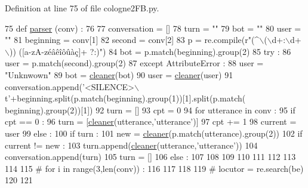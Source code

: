 Definition at line 75 of file cologne2\+F\+B.\+py.


\begin{DoxyCode}
75 \textcolor{keyword}{def }\hyperlink{namespaceparlai_1_1scripts_1_1cologne2FB_a3d8c5febb71cafe49cc8a5a71c4ba2c5}{parser} (conv) : 
76 
77     conversation = []
78     turn = \textcolor{stringliteral}{""}
79     bot = \textcolor{stringliteral}{""}
80     user = \textcolor{stringliteral}{""}
81     beginning = conv[1]
82     second = conv[2]
83     p = re.compile(\textcolor{stringliteral}{r"(^\(\backslash\)(\(\backslash\)d+:\(\backslash\)d+\(\backslash\))) ([a-zA-zéâêîôûàç]+ ?:)"})
84     bot = p.match(beginning).group(2)
85     \textcolor{keywordflow}{try} : 
86         user = p.match(second).group(2)
87     \textcolor{keywordflow}{except} AttributeError : 
88         user = \textcolor{stringliteral}{"Unknwown"}
89     bot = \hyperlink{namespaceparlai_1_1scripts_1_1cologne2FB_a8a2fb9f6897ef06ab2421d6682dca667}{cleaner}(bot)
90     user = \hyperlink{namespaceparlai_1_1scripts_1_1cologne2FB_a8a2fb9f6897ef06ab2421d6682dca667}{cleaner}(user)
91     conversation.append(\textcolor{stringliteral}{'<SILENCE>\(\backslash\)t'}+beginning.split(p.match(beginning).group(1))[1].split(p.match(
      beginning).group(2))[1])
92     turn = []
93     cpt = 0
94     \textcolor{keywordflow}{for} utterance \textcolor{keywordflow}{in} conv : 
95         \textcolor{keywordflow}{if} cpt == 0 : 
96             turn = [\hyperlink{namespaceparlai_1_1scripts_1_1cologne2FB_a8a2fb9f6897ef06ab2421d6682dca667}{cleaner}(utterance,\textcolor{stringliteral}{'utterance'})]
97             cpt += 1 
98             current = user
99         \textcolor{keywordflow}{else} : 
100             \textcolor{keywordflow}{if} turn :
101                 new = \hyperlink{namespaceparlai_1_1scripts_1_1cologne2FB_a8a2fb9f6897ef06ab2421d6682dca667}{cleaner}(p.match(utterance).group(2))
102                 \textcolor{keywordflow}{if} current != new : 
103                         turn.append(\hyperlink{namespaceparlai_1_1scripts_1_1cologne2FB_a8a2fb9f6897ef06ab2421d6682dca667}{cleaner}(utterance,\textcolor{stringliteral}{'utterance'}))
104                         conversation.append(turn)
105                         turn = []
106                     \textcolor{keywordflow}{else} : 
107 
108 
109 
110 
111 
112 
113 
114 
115     \textcolor{comment}{# for i in range(3,len(conv)) : }
116 
117 
118 
119     \textcolor{comment}{# locutor = re.search(be)}
120 
121 
\end{DoxyCode}
\mbox{\label{namespaceparlai_1_1scripts_1_1cologne2FB_a82c4edd06c5b6498faa16f8481278be4}} 
